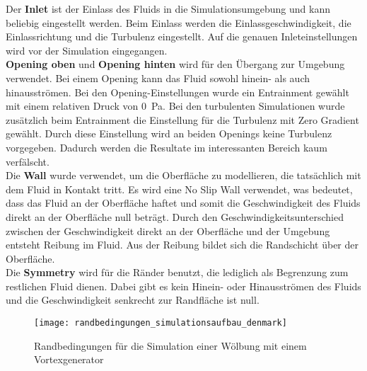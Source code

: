 Der \textbf{Inlet} ist der Einlass des Fluids in die Simulationsumgebung und kann beliebig eingestellt werden. Beim Einlass werden die Einlassgeschwindigkeit, die Einlassrichtung und die Turbulenz eingestellt.
Auf die genauen Inleteinstellungen wird vor der Simulation eingegangen. \\

\textbf{Opening oben} und \textbf{Opening hinten} wird für den Übergang zur Umgebung verwendet. 
Bei einem Opening kann das Fluid sowohl hinein- als auch hinausströmen.
Bei den Opening-Einstellungen wurde ein Entrainment gewählt mit einem relativen Druck von \SI{0}{Pa}.
Bei den turbulenten Simulationen wurde zusätzlich beim Entrainment die Einstellung für die Turbulenz mit Zero Gradient gewählt. Durch diese Einstellung wird an beiden Openings keine Turbulenz vorgegeben. Dadurch werden die Resultate im interessanten Bereich kaum verfälscht. \\

Die \textbf{Wall} wurde verwendet, um die Oberfläche zu modellieren, die tatsächlich mit dem Fluid in Kontakt tritt. Es wird eine No Slip Wall verwendet, was bedeutet, dass das Fluid an der Oberfläche haftet und somit die Geschwindigkeit des Fluids direkt an der Oberfläche null beträgt. Durch den Geschwindigkeitsunterschied zwischen der Geschwindigkeit direkt an der Oberfläche und der Umgebung entsteht Reibung im Fluid. Aus der Reibung bildet sich die Randschicht über der Oberfläche.\\ 

Die \textbf{Symmetry} wird für die Ränder benutzt, die lediglich als Begrenzung zum restlichen Fluid dienen. 
Dabei gibt es kein Hinein- oder Hinausströmen des Fluids und die Geschwindigkeit senkrecht zur Randfläche ist null.\\ 


\begin{figure}[htb!]
	\begin{center}
	\texttt{[image: randbedingungen\_simulationsaufbau\_denmark]}
	\caption{Randbedingungen für die Simulation einer Wölbung mit einem Vortexgenerator}
	\label{fig:randbedingungen_allgemein}
	\end{center}
	\end{figure}

\newpage

